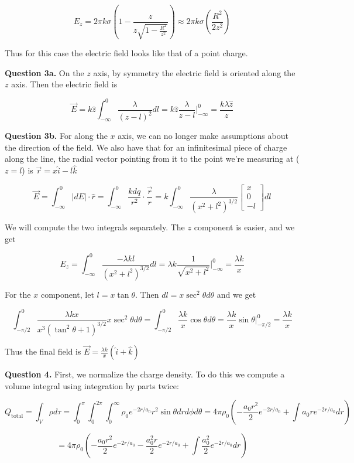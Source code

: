 \documentclass[letterpaper, reqno,11pt]{article}
\begin{document}
$$
    E_z=2\pi k\sigma(1-\frac{z}{z\sqrt{1-\frac{R^2}{z^2}}})\approx 2\pi k\sigma(\frac{R^2}{2z^2})
$$

Thus for this case the electric field looks like that of a point charge. 

{\noindent\bf Question 3a.} On the $z$ axis, by symmetry the electric field is oriented along the $z$ axis. Then the electric field is 

$$
    \vec E= k\hat z\int_{-\infty}^0 \frac{\lambda}{(z-l)^2}dl=k\hat z\frac{\lambda}{z-l}\bigg|_{-\infty}^0=\frac{k\lambda\hat z}{z}
$$

{\noindent\bf Question 3b.} For along the $x$ axis, we can no longer make assumptions about the direction of the field. We also have that for an infinitesimal piece of charge along the line, the radial vector pointing from it to the point we're measuring at ($z=l$) is $\vec r=x\hat i-l\hat k$

$$
    \vec E=\int_{-\infty}^0|dE|\cdot \hat r=\int_{-\infty}^0\frac{kdq}{r^2}\cdot \frac{\vec r}{r}=k\int_{-\infty}^0\frac{\lambda}{(x^2+l^2)^{3/2}}\begin{bmatrix}x\\0\\-l\end{bmatrix}dl
$$

We will compute the two integrals separately. The $z$ component is easier, and we get 

$$
    E_z=\int_{-\infty}^0\frac{-\lambda k l}{(x^2+l^2)^{3/2}}dl=\lambda k\frac1{\sqrt{x^2+l^2}}\bigg|_{-\infty}^0=\frac{\lambda k}{x}
$$

For the $x$ component, let $l=x\tan\theta$. Then $dl=x\sec^2\theta d\theta$ and we get 

$$
    \int_{-\pi/2}^0\frac{\lambda kx}{x^3(\tan^2\theta + 1)^{3/2}}x\sec^2\theta d\theta=\int_{-\pi/2}^0\frac{\lambda k}x \cos\theta d\theta=\frac{\lambda k}{x}\sin\theta\bigg|_{-\pi/2}^0=\frac{\lambda k}x
$$

Thus the final field is $\vec E=\frac{\lambda k}{x}(\hat i+\hat k)$

{\noindent\bf Question 4.} First, we normalize the charge density. To do this we compute a volume integral using integration by parts twice: 

$$
    Q_{\text{total}}=\int_V \rho d\tau=\int_0^\pi\int_0^{2\pi}\int_0^\infty\rho_0e^{-2r/a_0}r^2\sin\theta drd\phi d\theta=4\pi\rho_0(-\frac{a_0r^2}2e^{-2r/a_0}+\int a_0re^{-2r/a_0}dr)
$$

$$
    =4\pi\rho_0(-\frac{a_0r^2}2e^{-2r/a_0}-\frac{a_0^2r}2e^{-2r/a_0}+\int \frac{a_0^2}2e^{-2r/a_0}dr)
$$ 
    
\end{document}
